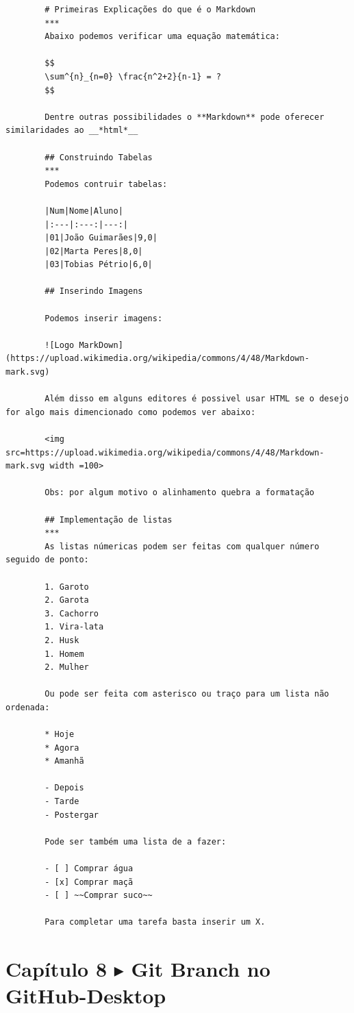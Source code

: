 \documentclass[a4paper]{article}
\begin{document}
    \begin{verbatim}
        # Primeiras Explicações do que é o Markdown
        ***
        Abaixo podemos verificar uma equação matemática:
        
        $$
        \sum^{n}_{n=0} \frac{n^2+2}{n-1} = ?
        $$
        
        Dentre outras possibilidades o **Markdown** pode oferecer similaridades ao __*html*__
        
        ## Construindo Tabelas
        ***
        Podemos contruir tabelas:
        
        |Num|Nome|Aluno|
        |:---|:---:|---:|
        |01|João Guimarães|9,0|
        |02|Marta Peres|8,0|
        |03|Tobias Pétrio|6,0|
        
        ## Inserindo Imagens
        
        Podemos inserir imagens:
        
        ![Logo MarkDown](https://upload.wikimedia.org/wikipedia/commons/4/48/Markdown-mark.svg)
        
        Além disso em alguns editores é possivel usar HTML se o desejo for algo mais dimencionado como podemos ver abaixo:
        
        <img src=https://upload.wikimedia.org/wikipedia/commons/4/48/Markdown-mark.svg width =100>
        
        Obs: por algum motivo o alinhamento quebra a formatação
        
        ## Implementação de listas
        ***
        As listas númericas podem ser feitas com qualquer número seguido de ponto:
        
        1. Garoto
        2. Garota
        3. Cachorro
        1. Vira-lata
        2. Husk
        1. Homem
        2. Mulher
        
        Ou pode ser feita com asterisco ou traço para um lista não ordenada:
        
        * Hoje
        * Agora
        * Amanhã
        
        - Depois
        - Tarde
        - Postergar
        
        Pode ser também uma lista de a fazer:
        
        - [ ] Comprar água
        - [x] Comprar maçã
        - [ ] ~~Comprar suco~~
        
        Para completar uma tarefa basta inserir um X.    
    \end{verbatim}
    
    \section{Capítulo 8 $ \blacktriangleright $ Git Branch no GitHub-Desktop}
    
\end{document}
